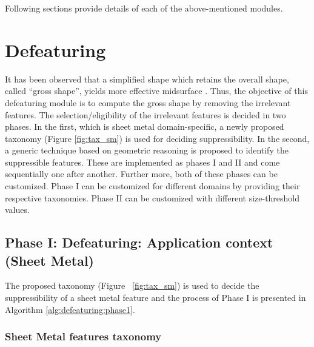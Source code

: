 Following sections provide details of each of the above-mentioned modules.

\section{Defeaturing} \label{cagd:sec:defeaturing}
It has been observed that a simplified shape which retains the overall shape, called ``gross shape'', yields more effective midsurface \cite{YogeshCADConf2015}. Thus, the objective of this defeaturing module is to compute the gross shape by removing the irrelevant features. The selection/eligibility of the irrelevant features is decided in two phases. In the first, which is sheet metal domain-specific, a newly proposed taxonomy (Figure \ref{fig:tax_sm}) is used for deciding suppressibility. In the second, a generic technique based on geometric reasoning is proposed to identify the suppressible features. These are implemented as phases I and II and come sequentially one after another. Further more, both of these phases can be customized. Phase I can be customized for different domains by providing their respective taxonomies. Phase II can be customized with different size-threshold values.

\subsection{Phase I: Defeaturing: Application context (Sheet Metal)}\label{ph1}
The proposed  taxonomy (Figure ~\ref{fig:tax_sm}) is used to decide the suppressibility of a sheet metal feature and the process of Phase I is presented in Algorithm \ref{alg:defeaturing:phase1}.

\subsubsection{Sheet Metal features taxonomy}

